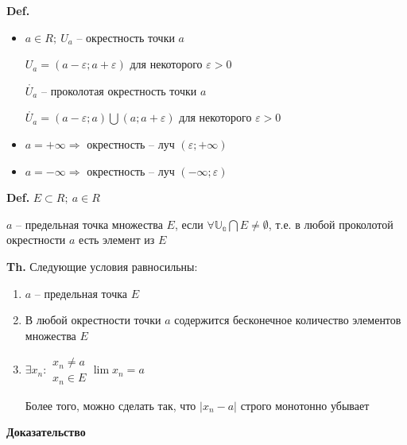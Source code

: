 \documentclass[14pt, letter paper]{article}
\begin{document}
\textbf{Def.}

\begin{itemize}
    \item $a \in R;\ U_a$ -- окрестность точки $a$

    $U_a = (a - \varepsilon; a + \varepsilon)$ для некоторого $\varepsilon > 0$

    $\mathring{U_a}$ -- проколотая окрестность точки $a$

    $\mathring{U_a} = (a - \varepsilon; a) \bigcup (a; a + \varepsilon)$ для некоторого $\varepsilon > 0$

    \item $a = + \infty \Rightarrow$ окрестность -- луч $(\varepsilon; + \infty)$

    \item $a = - \infty \Rightarrow$ окрестность -- луч $(- \infty; \varepsilon)$
\end{itemize}

\textbf{Def.} $E \subset R;\ a \in R$

$a$ -- предельная точка множества $E$, если $\forall \mathds{U_a} \bigcap E \neq \emptyset$, т.е. в любой проколотой окрестности $a$ есть элемент из $E$

\vspace{5mm}

\textbf{Th.} Следующие условия равносильны:

\begin{enumerate}
    \item $a$ -- предельная точка $E$
    \item В любой окрестности точки $a$ содержится бесконечное количество элементов множества $E$
    \item $\exists x_n : \begin{gathered}
        x_n \neq a \\
        x_n \in E
    \end{gathered} \lim{x_n} = a$

    Более того, можно сделать так, что $|x_n - a|$ строго монотонно убывает
\end{enumerate}

\begin{center}
    \textbf{Доказательство}
\end{center}
\end{document}
